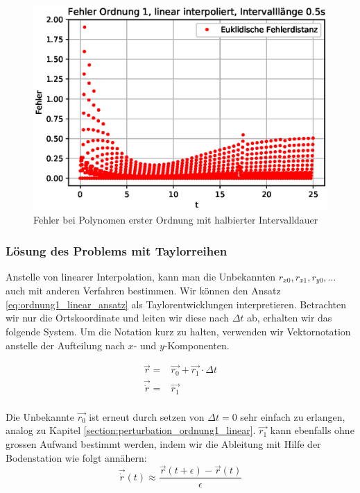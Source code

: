 \begin{figure}
	\centering
	\includegraphics[scale=0.7]{papers/perturbation/bilder/perturbation_fig8.eps}
	\caption{Fehler bei Polynomen erster Ordnung mit halbierter Intervalldauer}
	\label{fig:ordnung1_linear_error_C}
\end{figure}

\subsubsection{Lösung des Problems mit Taylorreihen}
Anstelle von linearer Interpolation, kann man die Unbekannten $r_{x0}, r_{x1}, r_{y0}, \dots$ auch mit anderen Verfahren bestimmen. 
Wir können den Ansatz \eqref{eq:ordnung1_linear_ansatz} als Taylorentwicklungen interpretieren. 
Betrachten wir nur die Ortskoordinate und leiten wir diese nach $\Delta t$ ab, erhalten wir das folgende System. Um die Notation kurz zu halten, verwenden wir Vektornotation anstelle der Aufteilung nach $x$- und $y$-Komponenten.

\begin{equation}
\label{eq:ordnung1_taylor_ansatz}
\begin{aligned}
\vec{r} = & \vec{r_0} + \vec{r_1} \cdot \Delta t \\
\vec{\dot{r}} = & \vec{r_1} \\
\end{aligned}
\end{equation}

Die Unbekannte $\vec{r_0}$ ist erneut durch setzen von $\Delta t = 0$ sehr einfach zu erlangen, analog zu Kapitel \ref{section:perturbation_ordnung1_linear}. $\vec{r_1}$ kann ebenfalls ohne grossen Aufwand bestimmt werden, indem wir die Ableitung mit Hilfe der Bodenstation wie folgt annähern:
\[
\vec{\dot{r}}(t) \approx \frac{\vec{r}(t+\epsilon) - \vec{r}(t)}{\epsilon}
\]

